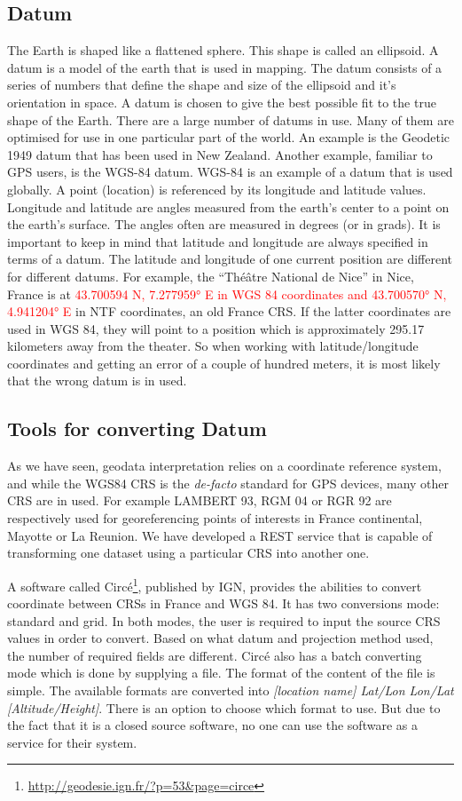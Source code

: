 \subsection{Datum}
The Earth is shaped like a flattened sphere. This shape is called an ellipsoid. A datum is a model of the earth that is used in mapping. The datum consists of a series of numbers that define the shape and size of the ellipsoid and it's orientation in space. A datum is chosen to give the best possible fit to the true shape of the Earth.
There are a large number of datums in use. Many of them are optimised for use in one particular part of the world. An example is the Geodetic 1949 datum that has been used in New Zealand. Another example, familiar to GPS users, is the WGS-84 datum. WGS-84 is an example of a datum that is used globally.
A point (location) is referenced by its longitude and latitude values. Longitude and latitude are angles measured from the earth's center to a point on the earth's surface. The angles often are measured in degrees (or in grads). It is important to keep in mind that latitude and longitude are always specified in terms of a datum. The latitude and longitude of one current position are different for different datums. For example, the ``Th\'{e}\^{a}tre National de Nice'' in Nice, France is at \textcolor{red}{43.700594 N, 7.277959° E in WGS 84 coordinates and 43.700570° N, 4.941204° E} in NTF coordinates, an old France CRS. If the latter coordinates are used in WGS 84, they will point to a position which is approximately 295.17 kilometers away from the theater. So when working with latitude/longitude coordinates and getting an error of a couple of hundred meters, it is most likely that the wrong datum is in used.

\subsection{Tools for converting Datum}
As we have seen, geodata interpretation relies on a coordinate reference system, and while the WGS84 CRS is the \textit{de-facto} standard for GPS devices, many other CRS are in used. For example LAMBERT 93, RGM 04 or RGR 92 are respectively used for georeferencing points of interests in France continental, Mayotte or La Reunion. We have developed a REST service that is capable of transforming one dataset using a particular CRS into another one. 

A software called Circ\'e\footnote{\url{http://geodesie.ign.fr/?p=53&page=circe}}, published by IGN, provides the abilities to convert coordinate between CRSs in France and WGS 84. It has two conversions mode: standard and grid. In both modes, the user is required to input the source CRS values in order to convert. Based on what datum and projection method used, the number of required fields are different. 
Circ\'e also has a batch converting mode which is done by supplying a file. The format of the content of the file is simple. The available formats are converted into \textsl{[location name] {Lat/Lon} {Lon/Lat} [Altitude/Height]}. There is an option to choose which format to use. But due to the fact that it is a closed source software, no one can use the software as a service for their system.

